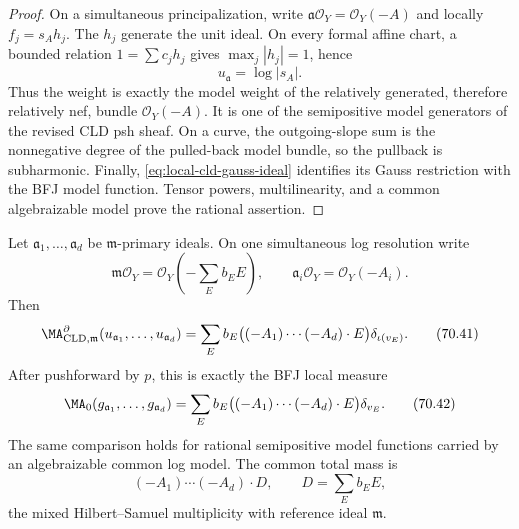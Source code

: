 \begin{proof}
On a simultaneous principalization, write
\(\mathfrak a\mathcal O_Y=\mathcal O_Y(-A)\) and locally
\(f_j=s_Ah_j\). The \(h_j\) generate the unit ideal. On every formal affine
chart, a bounded relation \(1=\sum c_jh_j\) gives
\(\max_j|h_j|=1\), hence
\[
                       u_{\mathfrak a}=\log|s_A|.
\]
Thus the weight is exactly the model weight of the relatively generated,
therefore relatively nef, bundle \(\mathcal O_Y(-A)\). It is one of the
semipositive model generators of the revised CLD psh sheaf. On a curve,
the outgoing-slope sum is the nonnegative degree of the pulled-back model
bundle, so the pullback is subharmonic. Finally,
\eqref{eq:local-cld-gauss-ideal} identifies its Gauss restriction with the
BFJ model function. Tensor powers, multilinearity, and a common
algebraizable model prove the rational assertion.
\end{proof}

\begin{theorem}\label{thm:local-cld-model-comparison}
Let \(\mathfrak a_1,\ldots,\mathfrak a_d\) be
\(\mathfrak m\)-primary ideals. On one simultaneous log resolution write
\[
 \mathfrak m\mathcal O_Y=\mathcal O_Y\!\left(-\sum_Eb_EE\right),
 \qquad
 \mathfrak a_i\mathcal O_Y=\mathcal O_Y(-A_i).
\]
Then
\[
 \MA^{\partial}_{\mathrm{CLD},\mathfrak m}
       (u_{\mathfrak a_1},\ldots,u_{\mathfrak a_d})
 =\sum_E b_E\bigl((-A_1)\cdots(-A_d)\cdot E\bigr)
       \delta_{\iota(v_E)}.
\tag{70.41}\label{eq:local-cld-atomic}
\]
After pushforward by \(p\), this is exactly the BFJ local measure
\[
 \MA_{0}(g_{\mathfrak a_1},\ldots,g_{\mathfrak a_d})
 =\sum_E b_E\bigl((-A_1)\cdots(-A_d)\cdot E\bigr)
       \delta_{v_E}.
\tag{70.42}\label{eq:local-cld-bfj-atomic}
\]
The same comparison holds for rational semipositive model functions carried
by an algebraizable common log model. The common total mass is
\[
 (-A_1)\cdots(-A_d)\cdot D,
 \qquad D=\sum_Eb_EE,
\tag{70.43}\label{eq:local-cld-total-mass}
\]
the mixed Hilbert--Samuel multiplicity with reference ideal
\(\mathfrak m\).
\end{theorem}

